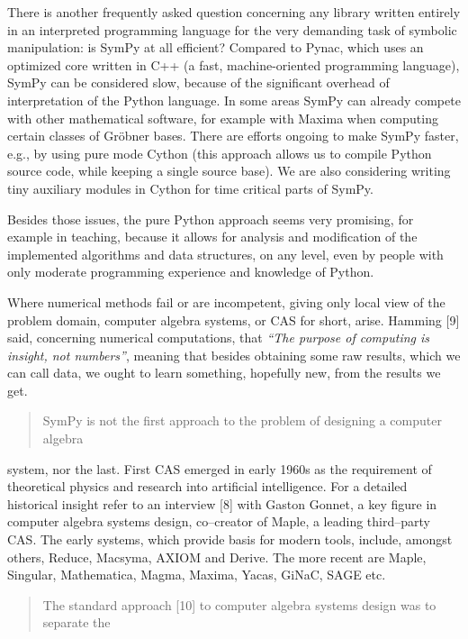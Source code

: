 There is another frequently asked question concerning any library
written entirely in an interpreted programming language for the very
demanding task of symbolic manipulation: is SymPy at all efficient?
Compared to Pynac, which uses an optimized core written in C++ (a
fast, machine-oriented programming language), SymPy can be considered
slow, because of the significant overhead of interpretation of the
Python language.  In some areas SymPy can already compete with other
mathematical software, for example with Maxima when computing certain
classes of Gröbner bases. There are efforts ongoing to make SymPy
faster, e.g., by using pure mode Cython (this approach allows us to
compile Python source code, while keeping a single source base). We
are also considering writing tiny auxiliary modules in Cython for time
critical parts of SymPy.

Besides those issues, the pure Python approach seems very promising,
for example in teaching, because it allows for analysis and
modification of the implemented algorithms and data structures, on any
level, even by people with only moderate programming experience and
knowledge of Python.

Where numerical methods fail or are incompetent, giving only local view of the problem
domain, computer algebra systems, or CAS for short, arise. Hamming {[}9{]} said, concerning
numerical computations, that \emph{``The purpose of computing is insight, not numbers''}, meaning
that besides obtaining some raw results, which we can call data, we ought to learn something,
hopefully new, from the results we get.
\begin{quote}

SymPy is not the first approach to the problem of designing a computer algebra
\end{quote}

system, nor the last. First CAS emerged in early 1960s as the requirement of
theoretical physics and research into artificial intelligence. For a detailed historical
insight refer to an interview {[}8{]} with Gaston Gonnet, a key figure in computer algebra
systems design, co–creator of Maple, a leading third–party CAS. The early systems,
which provide basis for modern tools, include, amongst others, Reduce, Macsyma,
AXIOM and Derive. The more recent are Maple, Singular, Mathematica, Magma,
Maxima, Yacas, GiNaC, SAGE etc.
\begin{quote}

The standard approach {[}10{]} to computer algebra systems design was to separate the
\end{quote}

